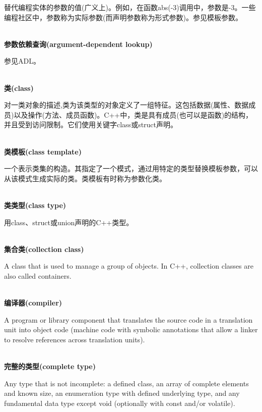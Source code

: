 替代编程实体的参数的值(广义上)。例如，在函数abs(-3)调用中，参数是-3。一些编程社区中，参数称为实际参数(而声明参数称为形式参数)。参见模板参数。

\hspace*{\fill} \\ %
\noindent
\textbf{参数依赖查询(argument-dependent lookup)}

参见ADL。

\hspace*{\fill} \\ %
\noindent
\textbf{类(class)}
 
对一类对象的描述,类为该类型的对象定义了一组特征。这包括数据(属性、数据成员)以及操作(方法、成员函数)。C++中，类是具有成员(也可以是函数)的结构，并且受到访问限制。它们使用关键字class或struct声明。

\hspace*{\fill} \\ %
\noindent
\textbf{类模板(class template)}

一个表示类集的构造。其指定了一个模式，通过用特定的类型替换模板参数，可以从该模式生成实际的类。类模板有时称为参数化类。

\hspace*{\fill} \\ %
\noindent
\textbf{类类型(class type)}

用class、struct或union声明的C++类型。

\hspace*{\fill} \\ %
\noindent
\textbf{集合类(collection class)}

A class that is used to manage a group of objects. In C++, collection classes are also called containers.

\hspace*{\fill} \\ %
\noindent
\textbf{编译器(compiler)}

A program or library component that translates the source code in a translation unit into object code (machine code with symbolic annotations that allow a linker to resolve references across translation units).

\hspace*{\fill} \\ %
\noindent
\textbf{完整的类型(complete type)}

Any type that is not incomplete: a defined class, an array of complete elements and known size, an enumeration type with defined underlying type, and any fundamental data type except void (optionally with const and/or volatile).

